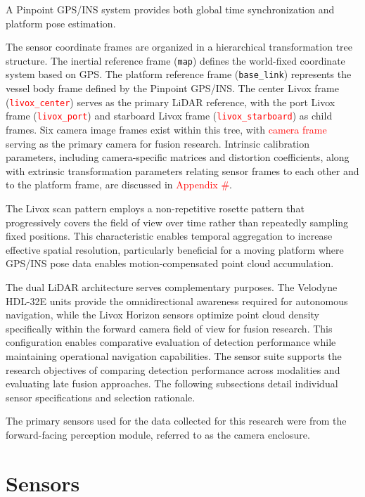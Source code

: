 \documentclass{erauthesis}
\begin{document}
A Pinpoint \ac{GPS}/\ac{INS} system provides both global time synchronization and platform pose estimation.

The sensor coordinate frames are organized in a hierarchical transformation tree structure.
The inertial reference frame (\texttt{map}) defines the world-fixed coordinate system based on \ac{GPS}.
The platform reference frame (\texttt{base\_link}) represents the vessel body frame defined by the Pinpoint \ac{GPS}/\ac{INS}.
The center Livox frame (\textcolor{red}{\texttt{livox\_center}}) serves as the primary \ac{LiDAR} reference, with the port Livox frame (\textcolor{red}{\texttt{livox\_port}}) and starboard Livox frame (\textcolor{red}{\texttt{livox\_starboard}}) as child frames.
Six camera image frames exist within this tree, with \textcolor{red}{camera frame} serving as the primary camera for fusion research.
Intrinsic calibration parameters, including camera-specific matrices and distortion coefficients, along with extrinsic transformation parameters relating sensor frames to each other and to the platform frame, are discussed in \textcolor{red}{Appendix \#}.

The Livox scan pattern employs a non-repetitive rosette pattern that progressively covers the field of view over time rather than repeatedly sampling fixed positions.
This characteristic enables temporal aggregation to increase effective spatial resolution, particularly beneficial for a moving platform where \ac{GPS}/\ac{INS} pose data enables motion-compensated point cloud accumulation.

The dual \ac{LiDAR} architecture serves complementary purposes.
The Velodyne HDL-32E units provide the omnidirectional awareness required for autonomous navigation, while the Livox Horizon sensors optimize point cloud density specifically within the forward camera field of view for fusion research.
This configuration enables comparative evaluation of detection performance while maintaining operational navigation capabilities.
The sensor suite supports the research objectives of comparing detection performance across modalities and evaluating late fusion approaches.
The following subsections detail individual sensor specifications and selection rationale.

The primary sensors used for the data collected for this research were from the forward-facing perception module, referred to as the camera enclosure.


    \section{Sensors}
\end{document}
